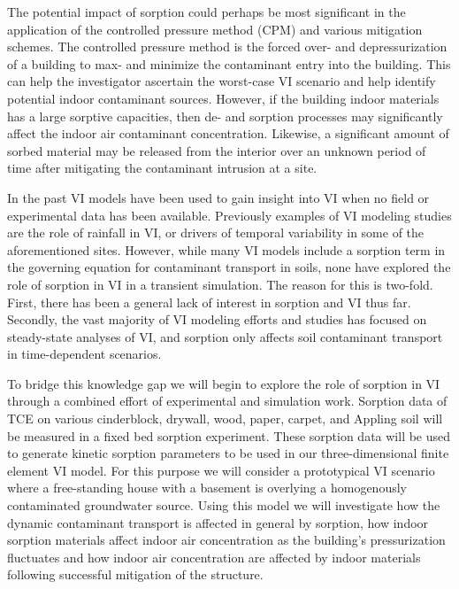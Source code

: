 The potential impact of sorption could perhaps be most significant in the application of the controlled pressure method (CPM) and various mitigation schemes.
The controlled pressure method is the forced over- and depressurization of a building to max- and minimize the contaminant entry into the building.
This can help the investigator ascertain the worst-case VI scenario and help identify potential indoor contaminant sources\cite{mchugh_recent_2017,holton_long-term_2015}.
However, if the building indoor materials has a large sorptive capacities, then de- and sorption processes may significantly affect the indoor air contaminant concentration.
Likewise, a significant amount of sorbed material may be released from the interior over an unknown period of time after mitigating the contaminant intrusion at a site\cite{meininghaus_diffusion_2000,meininghaus_diffusion_2002}.\par

In the past VI models have been used to gain insight into VI when no field or experimental data has been available.
Previously examples of VI modeling studies are the role of rainfall in VI\cite{shen_numerical_2012}, or drivers of temporal variability in some of the aforementioned sites\cite{strom_factors_2019}.
However, while many VI models include a sorption term in the governing equation for contaminant transport in soils, none have explored the role of sorption in VI in a transient simulation.
The reason for this is two-fold.
First, there has been a general lack of interest in sorption and VI thus far.
Secondly, the vast majority of VI modeling efforts and studies has focused on steady-state analyses of VI, and sorption only affects soil contaminant transport in time-dependent scenarios.\par

To bridge this knowledge gap we will begin to explore the role of sorption in VI through a combined effort of experimental and simulation work.
Sorption data of TCE on various cinderblock, drywall, wood, paper, carpet, and Appling soil will be measured in a fixed bed sorption experiment.
These sorption data will be used to generate kinetic sorption parameters to be used in our three-dimensional finite element VI model.
For this purpose we will consider a prototypical VI scenario where a free-standing house with a basement is overlying a homogenously contaminated groundwater source.
Using this model we will investigate how the dynamic contaminant transport is affected in general by sorption, how indoor sorption materials affect indoor air concentration as the building's pressurization fluctuates and how indoor air concentration are affected by indoor materials following successful mitigation of the structure.\par
